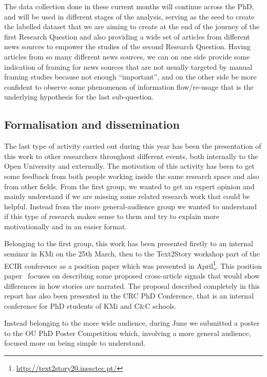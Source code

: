 
The data collection done in these current months will continue across the PhD, and will be used in different stages of the analysis, serving as the seed to create the labelled dataset that we are aiming to create at the end of the journey of the first Research Question and also providing a wide set of articles from different news sources to empower the studies of the second Research Question.
Having articles from so many different news sources, we can on one side provide some indication of framing for news sources that are not usually targeted by manual framing studies because not enough ``important'', and on the other side be more confident to observe some phenomenon of information flow/re-usage that is the underlying hypothesis for the last sub-question.

\subsection{Formalisation and dissemination}
The last type of activity carried out during this year has been the presentation of this work to other researchers throughout different events, both internally to the Open University and externally.
The motivation of this activity has been to get some feedback from both people working inside the same research space and also from other fields.
From the first group, we wanted to get an expert opinion and mainly understand if we are missing some related research work that could be helpful.
Instead from the more general-audience group we wanted to understand if this type of research makes sense to them and try to explain more motivationally and in an easier format.

Belonging to the first group, this work has been presented firstly to an internal seminar in KMi on the 25th March, then to the Text2Story workshop part of the ECIR conference as a position paper which was presented in April\footnote{\url{http://text2story20.inesctec.pt/}}.
This position paper~\cite{mensio2020towards} focuses on describing some proposed cross-article signals that would show differences in how stories are narrated.
The proposal described completely in this report has also been presented in the CRC PhD Conference, that is an internal conference for PhD students of KMi and C\&C schools.

Instead belonging to the more wide audience, during June we submitted a poster to the OU PhD Poster Competition which, involving a more general audience, focused more on being simple to understand.

